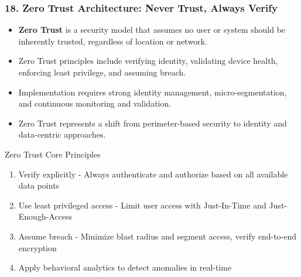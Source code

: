 \documentclass{beamer}
\begin{document}
	\begin{frame}
		\frametitle{18. Zero Trust Architecture: Never Trust, Always Verify}
		\begin{itemize}
			\item \textbf{Zero Trust} is a security model that assumes no user or system should be inherently trusted, regardless of location or network.
			\item Zero Trust principles include verifying identity, validating device health, enforcing least privilege, and assuming breach.
			\item Implementation requires strong identity management, micro-segmentation, and continuous monitoring and validation.
			\item Zero Trust represents a shift from perimeter-based security to identity and data-centric approaches.
		\end{itemize}
		
		\begin{block}{Zero Trust Core Principles}
			\scriptsize
			\begin{enumerate}
				\item Verify explicitly - Always authenticate and authorize based on all available data points
				\item Use least privileged access - Limit user access with Just-In-Time and Just-Enough-Access
				\item Assume breach - Minimize blast radius and segment access, verify end-to-end encryption
				\item Apply behavioral analytics to detect anomalies in real-time
			\end{enumerate}
		\end{block}
	\end{frame}
	
\end{document}
